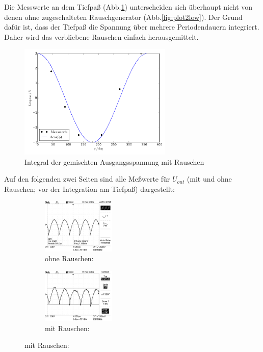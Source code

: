 Die Messwerte an dem Tiefpaß (Abb.\ref{fig:plot3low}) unterscheiden sich
überhaupt nicht von denen ohne zugeschalteten
Rauschgenerator (Abb.\ref{fig:plot2low}).
Der Grund dafür ist, dass der Tiefpaß die Spannung über mehrere
Periodendauern integriert. Daher wird das verbliebene Rauschen einfach
herausgemittelt.
\begin{figure}[H]
  \centering
  \includegraphics[width=0.65\textwidth, height=0.35\textwidth]{plot3low.pdf}
  \caption{Integral der gemischten Ausgangsspannung mit Rauschen}
  \label{fig:plot3low}
\end{figure}
Auf den folgenden zwei Seiten sind alle Meßwerte für $U_{out}$
(mit und ohne Rauschen; vor der Integration am Tiefpaß) dargestellt:
\newpage
\captionsetup{labelformat=empty}
\begin{figure}[H]
  \caption*{$U_{out} ( \phi = 0°$) }
  \centering
  \begin{subfigure}{0.48\textwidth}
      \centering
      \caption*{ohne Rauschen:}
      \includegraphics[angle=90,height=2.6cm]{graphics/ALL0031/F0031TEK.jpg}
  \end{subfigure}
  \begin{subfigure}{0.48\textwidth}
      \centering
      \caption*{mit Rauschen:}
      \includegraphics[angle=90,height=2.6cm]{graphics/ALL0039/F0039TEK.jpg}
  \end{subfigure}
\end{figure}
\addtocounter{figure}{-1}
